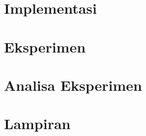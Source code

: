 \documentclass[12pt,a4paper]{report}
\begin{document}
	\chapter{Implementasi}
	
	
	\chapter{Eksperimen}
	
	
	\chapter{Analisa Eksperimen}
	

	\chapter{Lampiran}
	
	
	
	
\end{document}
